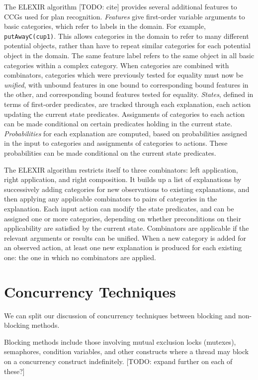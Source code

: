The ELEXIR algorithm [TODO: cite] provides several additional features to CCGs used for plan recognition. \emph{Features} give first-order variable arguments to basic categories, which refer to labels in the domain. For example, \texttt{putAwayC(cup1)}. This allows categories in the domain to refer to many different potential objects, rather than have to repeat similar categories for each potential object in the domain. The same feature label refers to the same object in all basic categories within a complex category. When categories are combined with combinators, categories which were previously tested for equality must now be \emph{unified}, with unbound features in one bound to corresponding bound features in the other, and corresponding bound features tested for equality. \emph{States}, defined in terms of first-order predicates, are tracked through each explanation, each action updating the current state predicates. Assignments of categories to each action can be made conditional on certain 
predicates holding in the current state. \emph{Probabilities} for each explanation are computed, based on probabilities assigned in the input to categories and assignments of categories to actions. These probabilities can be made conditional on the current state predicates.

The ELEXIR algorithm restricts itself to three combinators: left application, right application, and right composition. It builds up a list of explanations by successively adding categories for new observations to existing explanations, and then applying any applicable combinators to pairs of categories in the explanation. Each input action can modify the state predicates, and can be assigned one or more categories, depending on whether preconditions on their applicability are satisfied by the current state. Combinators are applicable if the relevant arguments or results can be unified. When a new category is added for an observed action, at least one new explanation is produced for each existing one: the one in which no combinators are applied.

\section{Concurrency Techniques}

We can split our discussion of concurrency techniques between blocking and non-blocking methods.

Blocking methods include those involving mutual exclusion locks (mutexes), semaphores, condition variables, and other constructs where a thread may block on a concurrency construct indefinitely. [TODO: expand further on each of these?]

